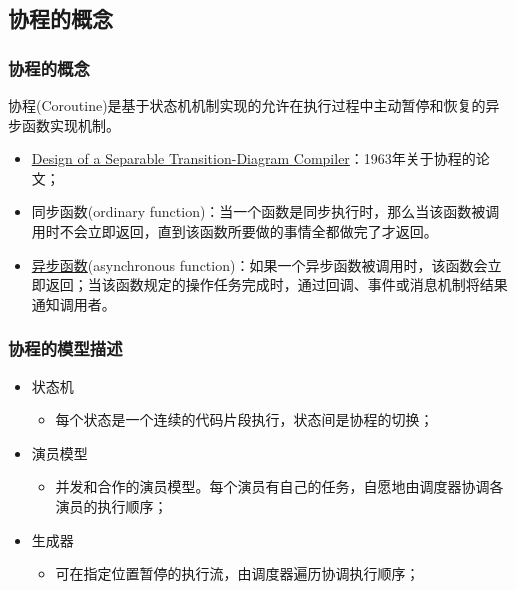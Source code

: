 \subsection{协程的概念}
% 
\begin{frame}[fragile]
    \frametitle{协程的概念}
% 
协程(Coroutine)是基于状态机机制实现的允许在执行过程中主动暂停和恢复的异步函数实现机制。

    \begin{itemize}
        \item \href{http://melconway.com/Home/pdf/compiler.pdf}{Design of a Separable Transition-Diagram Compiler}：1963年关于协程的论文； \pause
        \item 同步函数(ordinary function)：当一个函数是同步执行时，那么当该函数被调用时不会立即返回，直到该函数所要做的事情全都做完了才返回。 \pause
        \item \href{https://www.cnblogs.com/balingybj/p/4780442.html}{异步函数}(asynchronous function)：如果一个异步函数被调用时，该函数会立即返回；当该函数规定的操作任务完成时，通过回调、事件或消息机制将结果通知调用者。
    \end{itemize}

% 

\end{frame}
\begin{frame}[fragile]
    \frametitle{协程的模型描述}

    \begin{itemize}
        \item 状态机
            \begin{itemize}
            \item 每个状态是一个连续的代码片段执行，状态间是协程的切换； \pause
            \end{itemize}
        \item 演员模型
            \begin{itemize}
            \item 并发和合作的演员模型。每个演员有自己的任务，自愿地由调度器协调各演员的执行顺序； \pause
            \end{itemize}
        \item 生成器
        \begin{itemize}
            \item 可在指定位置暂停的执行流，由调度器遍历协调执行顺序；
        \end{itemize}
    \end{itemize}
\end{frame}
